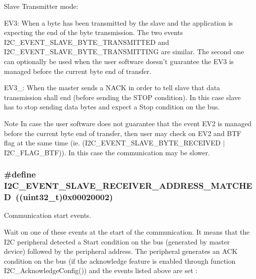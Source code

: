 \begin{DoxyItemize}
\item Slave Transmitter mode:
\begin{DoxyItemize}
\item EV3: When a byte has been transmitted by the slave and the application is expecting the end of the byte transmission. The two events I2C\_\-EVENT\_\-SLAVE\_\-BYTE\_\-TRANSMITTED and I2C\_\-EVENT\_\-SLAVE\_\-BYTE\_\-TRANSMITTING are similar. The second one can optionally be used when the user software doesn't guarantee the EV3 is managed before the current byte end of transfer.
\item EV3\_: When the master sends a NACK in order to tell slave that data transmission shall end (before sending the STOP condition). In this case slave has to stop sending data bytes and expect a Stop condition on the bus.
\end{DoxyItemize}
\end{DoxyItemize}

\begin{DoxyNote}{Note}
In case the user software does not guarantee that the event EV2 is managed before the current byte end of transfer, then user may check on EV2 and BTF flag at the same time (ie. (I2C\_\-EVENT\_\-SLAVE\_\-BYTE\_\-RECEIVED $|$ I2C\_\-FLAG\_\-BTF)). In this case the communication may be slower. 
\end{DoxyNote}
\hypertarget{group__I2C__Events_ga6cf0e334704618b024eee604849f50f7}{
\subsubsection[{I2C\_\-EVENT\_\-SLAVE\_\-RECEIVER\_\-ADDRESS\_\-MATCHED}]{\setlength{\rightskip}{0pt plus 5cm}\#define I2C\_\-EVENT\_\-SLAVE\_\-RECEIVER\_\-ADDRESS\_\-MATCHED~((uint32\_\-t)0x00020002)}}
\label{group__I2C__Events_ga6cf0e334704618b024eee604849f50f7}


Communication start events. 

Wait on one of these events at the start of the communication. It means that the I2C peripheral detected a Start condition on the bus (generated by master device) followed by the peripheral address. The peripheral generates an ACK condition on the bus (if the acknowledge feature is enabled through function I2C\_\-AcknowledgeConfig()) and the events listed above are set :

